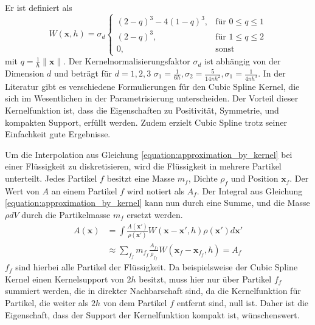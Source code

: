 \documentclass{scrreprt}
\begin{document}
Er ist definiert als
\begin{equation}
    W(\textbf{x}, h) = \sigma_d \begin{cases}
        (2-q)^3 - 4(1-q)^3, &\text{für } 0 \leq q \leq 1\\
        (2-q)^3, &\text{für } 1 \leq q \leq 2\\
        0, &\text{sonst}
    \end{cases}
\end{equation}
mit $q = \frac{1}{h}\|\textbf{x}\|$. Der Kernelnormalisierungsfaktor $\sigma_d$ ist abhängig von der Dimension $d$
und beträgt für $d = 1,2,3$ $\sigma_1 = \frac{1}{6h}, \sigma_2 = \frac{5}{14\pi h^2}, \sigma_1 = \frac{1}{4\pi h^3}$.
In der Literatur gibt es verschiedene Formulierungen für den Cubic Spline Kernel, die sich im Wesentlichen in der Parametrisierung unterscheiden.
Der Vorteil dieser Kernelfunktion ist, dass die Eigenschaften zu Positivität, Symmetrie, und kompakten Support, erfüllt werden.
Zudem erzielt Cubic Spline trotz seiner Einfachkeit gute Ergebnisse.

Um die Interpolation aus Gleichung \ref{equation:approximation_by_kernel} bei einer Flüssigkeit zu diskretisieren,
wird die Flüssigkeit in mehrere Partikel unterteilt. Jedes Partikel $f$ besitzt eine Masse $m_f$, Dichte $\rho_f$ und Position $\textbf{x}_f$.
Der Wert von $A$ an einem Partikel $f$ wird notiert als $A_f$.
Der Integral aus Gleichung \ref{equation:approximation_by_kernel} kann nun durch eine Summe, und die Masse $\rho dV$ durch die Partikelmasse $m_f$ ersetzt werden.
\begin{align}
    A(\textbf{x}) &= \int \frac{A(\textbf{x}')}{\rho(\textbf{x}')} W(\textbf{x} - \textbf{x}', h) \rho(\textbf{x}')d\textbf{x}'\\
                  &\approx \sum_{f_f} m_{f_f} \frac{A_{f_f}}{\rho_{f_f}} W(\textbf{x}_f - \textbf{x}_{f_f}, h) = A_f
\end{align}
$f_f$ sind hierbei alle Partikel der Flüssigkeit.
Da beispielsweise der Cubic Spline Kernel einen Kernelsupport von $2h$ besitzt, muss hier nur über Partikel $f_f$ summiert werden, die in direkter Nachbarschaft sind,
da die Kernelfunktion für Partikel, die weiter als $2h$ von dem Partikel $f$ entfernt sind, null ist.
Daher ist die Eigenschaft, dass der Support der Kernelfunktion kompakt ist, wünschenswert.
\end{document}
